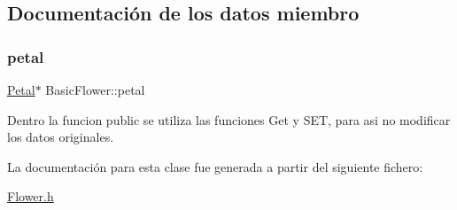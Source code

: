 \subsection{Documentación de los datos miembro}
\mbox{\label{class_basic_flower_a7adedb18ffb4d77cf988168828c1065f}} 
\subsubsection{\texorpdfstring{petal}{petal}}
{\footnotesize\ttfamily \mbox{\hyperlink{class_petal}{Petal}}$\ast$ Basic\+Flower\+::petal}

Dentro la funcion public se utiliza las funciones Get y S\+ET, para asi no modificar los datos originales. 

La documentación para esta clase fue generada a partir del siguiente fichero\+:\begin{DoxyCompactItemize}
\item 
\mbox{\hyperlink{_flower_8h}{Flower.\+h}}\end{DoxyCompactItemize}
